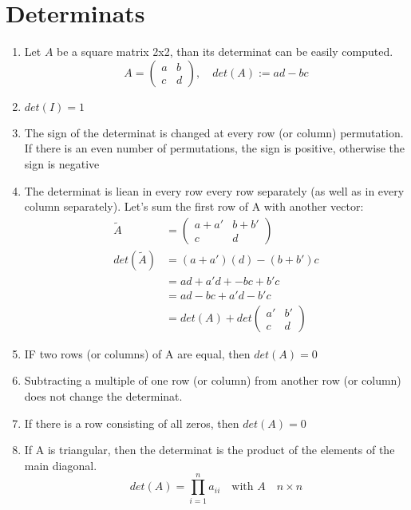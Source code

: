 \chapter*{Determinats}

\begin{enumerate}
    \item Let $A$ be a square matrix 2x2, than its determinat can be easily computed.
        $$
        A = \begin{pmatrix}
            a & b \\
            c & d
        \end{pmatrix}, \quad det(A) := ad - bc
        $$
    \item $det(I) = 1$
    \item The sign of the determinat is changed at every row (or column) permutation.
          If there is an even number of permutations, the sign is positive, otherwise the sign is negative
    \item The determinat is liean in every row every row separately (as well as in every column separately).
    Let's sum the first row of A with another vector:
    $$
    \begin{aligned}
        \tilde{A} &= \begin{pmatrix}
            a + a' & b + b' \\
            c & d
        \end{pmatrix} \\
        det(\tilde{A}) &= (a + a')(d) - (b + b')c \\
        &= ad + a'd+ - bc + b'c \\
        &= ad -bc + a'd - b'c \\
        &=  det(A) + det\begin{pmatrix}
            a' & b' \\
            c & d
        \end{pmatrix}
    \end{aligned}
    $$
    \item IF two rows (or columns) of A are equal, then $det(A) = 0$
    \item Subtracting a multiple of one row (or column) from another row (or column) does not change the determinat.
    \item If there is a row consisting of all zeros, then $det(A) = 0$
    \item If A is triangular, then the determinat is the product of the elements of the main diagonal.
          $$ det(A) = \prod_{i=1}^n a_{ii} \quad \text{with } A \quad n \times n $$

\end{enumerate}
